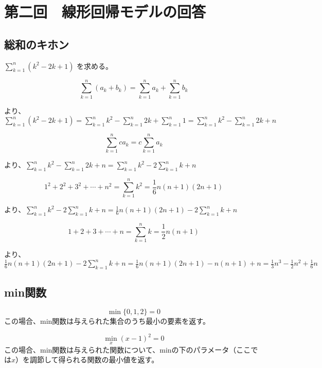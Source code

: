 \section*{第二回　線形回帰モデルの回答}

\subsection*{総和のキホン}

$\sum_{k=1}^n (k^2 - 2k + 1)$ を求める。

\begin{equation*}
	\sum_{k=1}^n (a_k + b_k) = \sum_{k=1}^n a_k + \sum_{k=1}^n b_k
\end{equation*} 

より、$\sum_{k=1}^n (k^2 - 2k + 1) = \sum_{k=1}^n k^2 -  \sum_{k=1}^n 2k +  \sum_{k=1}^n 1 = \sum_{k=1}^n k^2 -  \sum_{k=1}^n 2k +  n $ 

\begin{equation*}
	\sum_{k=1}^n ca_k = c\sum_{k=1}^n a_k
\end{equation*}

より、$ \sum_{k=1}^n k^2 - \sum_{k=1}^n 2k +  n = \sum_{k=1}^n k^2 - 2 \sum_{k=1}^n k + n $ 

\begin{equation*}
1^2 + 2^2 + 3^2 + \cdots + n^2 = \sum_{k=1}^n k^2
 = \frac{1}{6}n(n+1)(2n+1)	
\end{equation*}

より、$ \sum_{k=1}^n k^2 - 2 \sum_{k=1}^n k + n = \frac{1}{6}n(n+1)(2n+1) - 2 \sum_{k=1}^n k + n $

\begin{equation*}
1+2+3+\cdots + n = \sum_{k=1}^n k = \frac{1}{2}n (n+1)	
\end{equation*}

より、$ \frac{1}{6}n(n+1)(2n+1) - 2 \sum_{k=1}^n k + n = \frac{1}{6}n(n+1)(2n+1) - n(n+1) + n = \frac{1}{3}n^3 - \frac{1}{2}n^2 + \frac{1}{6}n $


\subsection*{min関数}
\begin{equation*}
	\min \{ 0, 1, 2 \} = 0
\end{equation*}
この場合、min関数は与えられた集合のうち最小の要素を返す。

\begin{equation*}
	\min_{x} (x-1)^2  = 0
\end{equation*}
この場合、min関数は与えられた関数について、minの下のパラメータ（ここでは$x$）を調節して得られる関数の最小値を返す。

